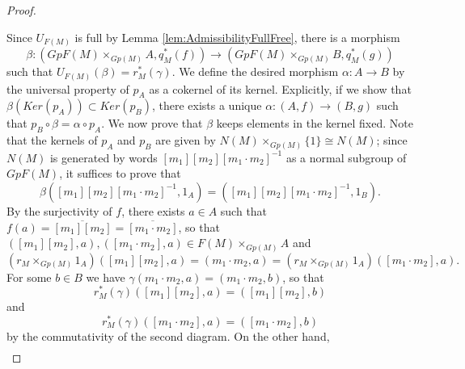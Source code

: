 \begin{lemma}
\begin{proof}
\begin{center}
        \end{center}
        Since $U_{F(M)}$ is full by Lemma \ref{lem:AdmissibilityFullFree}, there is a morphism
        \[ \beta:(GpF(M)\times_{Gp(M)}A, q_M^*(f))\longrightarrow(GpF(M)\times_{Gp(M)}B, q_M^*(g)) \]
        such that $U_{F(M)}(\beta) = r_M^*(\gamma)$.
        We define the desired morphism $\alpha:A\to B$ by the universal property of $p_A$ as a cokernel of its kernel. Explicitly, if we show that $\beta(Ker(p_A))\subset Ker(p_B)$, there exists a unique $\alpha:(A,f)\longrightarrow(B,g)$ such that $p_B\circ\beta = \alpha\circ p_A$. We now prove that $\beta$ keeps elements in the kernel fixed. Note that the kernels of $p_A$ and $p_B$ are given by $N(M)\times_{Gp(M)}\{1\}\cong N(M)$; since $N(M)$ is generated by words $[m_1][m_2][m_1\cdot m_2]^{-1}$ as a normal subgroup of $GpF(M)$, it suffices to prove that
        \[ \beta([m_1][m_2][m_1\cdot m_2]^{-1}, 1_A) = ([m_1][m_2][m_1\cdot m_2]^{-1}, 1_B). \]
        By the surjectivity of $f$, there exists $a\in A$ such that $f(a)=\overline{[m_1][m_2]}=\overline{[m_1\cdot m_2]}$, so that $([m_1][m_2],a),([m_1\cdot m_2],a)\in F(M)\times_{Gp(M)}A$ and
        \[ (r_M\times_{Gp(M)}1_A)([m_1][m_2],a) = (m_1\cdot m_2,a) =(r_M\times_{Gp(M)}1_A)([m_1\cdot m_2],a). \]
        For some $b\in B$ we have $\gamma(m_1\cdot m_2,a) =(m_1\cdot m_2,b)$, so that
        \[ r_M^*(\gamma)([m_1][m_2],a)=([m_1][m_2],b) \]
        and
        \[ r_M^*(\gamma)([m_1\cdot m_2],a)=([m_1\cdot m_2],b) \]
        by the commutativity of the second diagram. On the other hand, 
        \begin{align*}

\end{align*}
\end{proof}
\end{lemma}
